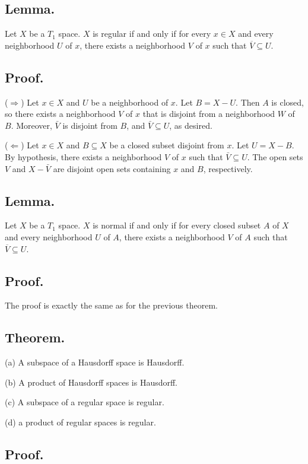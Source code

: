 \documentclass[titlepage]{article}
\begin{document}
\subsection{Lemma.} Let $X$ be a $T_{1}$ space. $X$ is regular if and only if for every $x \in X$ and every neighborhood $U$ of $x$, there exists a neighborhood $V$ of $x$ such that $\overline{V} \subseteq U$.

\subsection{Proof.}

($\Rightarrow$) Let $x \in X$ and $U$ be a neighborhood of $x$. Let $B = X - U$. Then $A$ is closed, so there exists a neighborhood $V$ of $x$ that is disjoint from a neighborhood $W$ of $B$. Moreover, $\bar{V}$ is disjoint from $B$, and $\bar{V} \subseteq U$, as desired.

($\Leftarrow$) Let $x \in X$ and $B \subseteq X$ be a closed subset disjoint from $x$. Let $U = X - B$. By hypothesis, there exists a neighborhood $V$ of $x$ such that $\bar{V} \subseteq U$. The open sets $V$ and $X - \bar{V}$ are disjoint open sets containing $x$ and $B$, respectively.

\subsection{Lemma.} Let $X$ be a $T_{1}$ space. $X$ is normal if and only if for every closed subset $A$ of $X$ and every neighborhood $U$ of $A$, there exists a neighborhood $V$ of $A$ such that $\overline{V} \subseteq U$.

\subsection{Proof.} The proof is exactly the same as for the previous theorem.

\subsection{Theorem.}

(a) A subspace of a Hausdorff space is Hausdorff.

(b) A product of Hausdorff spaces is Hausdorff.

(c) A subspace of a regular space is regular.

(d) a product of regular spaces is regular.

\subsection{Proof.}
\end{document}
